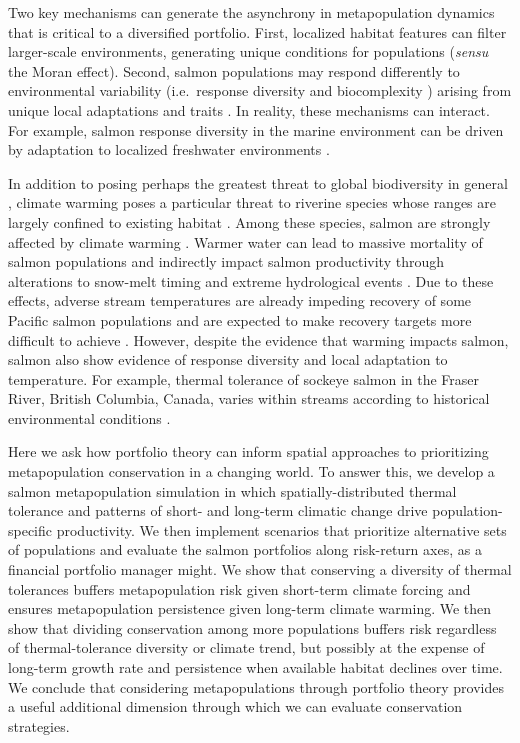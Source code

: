 Two key mechanisms can generate the asynchrony in metapopulation dynamics that is critical to a diversified portfolio. First, localized habitat features can filter larger-scale environments, generating unique conditions for populations \citep{schindler2008} (\emph{sensu} the Moran effect). Second, salmon populations may respond differently to environmental variability (i.e.~response diversity \citep{elmqvist2003} and biocomplexity \citep{hilborn2003}) arising from unique local adaptations and traits \citep{fraser2011, eliason2011, thorson2014}. In reality, these mechanisms can interact. For example, salmon response diversity in the marine environment can be driven by adaptation to localized freshwater environments \citep{johnson2013a}.

In addition to posing perhaps the greatest threat to global biodiversity in general \citep{thomas2004}, climate warming poses a particular threat to riverine species whose ranges are largely confined to existing habitat \citep{thomas2010}. Among these species, salmon are strongly affected by climate warming \citep[e.g.][]{patterson2007}. Warmer water can lead to massive mortality of salmon populations \citep[e.g.][]{patterson2007} and indirectly impact salmon productivity through alterations to snow-melt timing and extreme hydrological events \citep{crozier2008}. Due to these effects, adverse stream temperatures are already impeding recovery of some Pacific salmon populations \citep{mccullough1999} and are expected to make recovery targets more difficult to achieve \citep{battin2007}. However, despite the evidence that warming impacts salmon, salmon also show evidence of response diversity and local adaptation to temperature. For example, thermal tolerance of sockeye salmon in the Fraser River, British Columbia, Canada, varies within streams according to historical environmental conditions \citep{eliason2011}.

Here we ask how portfolio theory can inform spatial approaches to prioritizing metapopulation conservation in a changing world. To answer this, we develop a salmon metapopulation simulation in which spatially-distributed thermal tolerance and patterns of short- and long-term climatic change drive population-specific productivity. We then implement scenarios that prioritize alternative sets of populations and evaluate the salmon portfolios along risk-return axes, as a financial portfolio manager might. We show that conserving a diversity of thermal tolerances buffers metapopulation risk given short-term climate forcing and ensures metapopulation persistence given long-term climate warming. We then show that dividing conservation among more populations buffers risk regardless of thermal-tolerance diversity or climate trend, but possibly at the expense of long-term growth rate and persistence when available habitat declines over time. We conclude that considering metapopulations through portfolio theory provides a useful additional dimension through which we can evaluate conservation strategies.

